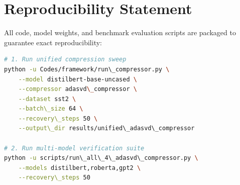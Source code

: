 \section{Reproducibility Statement}
All code, model weights, and benchmark evaluation scripts are packaged to guarantee exact reproducibility:
\begin{lstlisting}[language=bash]
# 1. Run unified compression sweep
python -u Codes/framework/run\_compressor.py \
    --model distilbert-base-uncased \
    --compressor adasvd\_compressor \
    --dataset sst2 \
    --batch\_size 64 \
    --recovery\_steps 50 \
    --output\_dir results/unified\_adasvd\_compressor

# 2. Run multi-model verification suite
python -u scripts/run\_all\_4\_adasvd\_compressor.py \
    --models distilbert,roberta,gpt2 \
    --recovery\_steps 50
\end{lstlisting}
